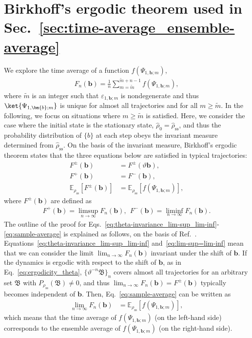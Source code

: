 \documentclass[preprint,pteplogo]{ptephy_v2}%
\numberwithin{equation}{section}
\theoremstyle{definition}
\begin{document}
\section{Birkhoff's ergodic theorem used in Sec.~\ref{sec:time-average_ensemble-average}}
\label{app:Birkhoff-theorem}
We explore the time average of a function $f(\Psi_{1,\bm{b};m})$,
\begin{align}
F_n(\bm{b})=\frac{1}{n}\sum_{m=\tilde{m}}^{\tilde{m}+n-1}f(\Psi_{1,\bm{b};m}),
\label{eq:time-average_finite}
\end{align}
where $\tilde{m}$ is an integer such that $\varepsilon_{1,\bm{b};m}$ is nondegenerate and thus $\ket{\Psi_{1,\bm{b};m}}$ is unique for almost all trajectories and for all $m\geq\tilde{m}$. 
In the following, we focus on situations where $m\geq\tilde{m}$ is satisfied. 
Here, we consider the case where the initial state is the stationary state, $\hat{\rho}_0=\hat{\rho}_\mathrm{ss}$, and thus the probability distribution of $\{b\}$ at each step obeys the invariant measure determined from $\hat{\rho}_\mathrm{ss}$. 
On the basis of the invariant measure, Birkhoff's ergodic theorem states that the three equations below are satisfied in typical trajectories:
\begin{align}
F^\pm(\bm{b})&=F^\pm(\vartheta\bm{b}),
\label{eq:theta-invariance_lim-sup_lim-inf}\\
F^+(\bm{b})&=F^-(\bm{b}),
\label{eq:lim-sup=lim-inf}\\
\mathbb{E}_{\rho_\mathrm{ss}}\left[F^\pm(\bm{b})\right]&=\mathbb{E}_{\rho_\mathrm{ss}}\left[f(\Psi_{1,\bm{b};m})\right],
\label{eq:sample-average}
\end{align}
where $F^\pm(\bm{b})$ are defined as
\begin{align}
F^+(\bm{b})=\limsup_{n\rightarrow\infty}F_n(\bm{b}),\ \ 
F^-(\bm{b})=\liminf_{n\rightarrow\infty}F_n(\bm{b}).
\end{align}
The outline of the proof for Eqs.~\eqref{eq:theta-invariance_lim-sup_lim-inf}-\eqref{eq:sample-average} is explained as follows, on the basis of Ref.~\cite{walters2000introduction}. 
Equations~\eqref{eq:theta-invariance_lim-sup_lim-inf} and~\eqref{eq:lim-sup=lim-inf} mean that we can consider the limit $\lim_{n\rightarrow\infty}F_n(\bm{b})$ invariant under the shift of $\bm{b}$.
If the dynamics is ergodic with respect to the shift of $\bm{b}$, as in Eq.~\eqref{eq:ergodicity_theta}, $\{\vartheta^{-n}\mathfrak{B}\}_n$ covers almost all trajectories for an arbitrary set $\mathfrak{B}$ with $P_{\rho_\mathrm{ss}}(\mathfrak{B})\neq0$, and thus $\lim_{n\rightarrow\infty}F_n(\bm{b})=F^\pm(\bm{b})$ typically becomes independent of $\bm{b}$. 
Then, Eq.~\eqref{eq:sample-average} can be written as
\begin{align}
\lim_{n\rightarrow\infty}F_n(\bm{b})
&=\mathbb{E}_{\rho_\mathrm{ss}}\left[f(\Psi_{1,\bm{b};m})\right],
\label{eq:time-average=sample-average}
\end{align}
which means that the time average of $f(\Psi_{1,\bm{b};m})$ (on the left-hand side) corresponds to the ensemble average of $f(\Psi_{1,\bm{b};m})$ (on the right-hand side). 
\end{document}
